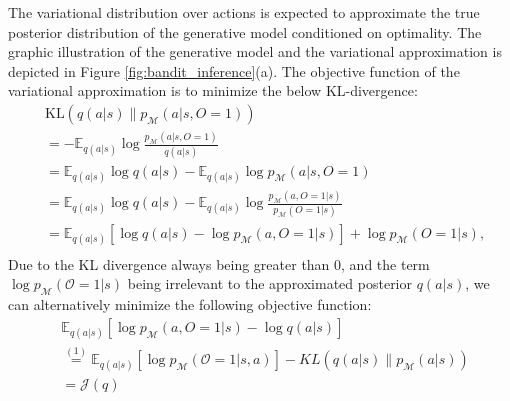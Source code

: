 \documentclass{article} %
\theoremstyle{plain}
\theoremstyle{definition}
\theoremstyle{remark}
\newcommand{\fig}{{Figure }}
\begin{document}
{The variational distribution over actions is expected to approximate the true posterior distribution of the generative model conditioned on optimality. The graphic illustration of the generative model and the variational approximation is depicted in \fig \ref{fig:bandit_inference}(a). The objective function of the variational approximation is to minimize the below KL-divergence:
\begin{equation}
\begin{aligned}
    &\text{KL}(q(a|s)\|p_{\mathcal{M}}(a|s,O=1))\\
    &=-\mathbb{E}_{q(a|s)} \log \frac{p_{\mathcal{M}}(a|s,O=1)}{q(a|s)}\\
    &=\mathbb{E}_{q(a|s)} \log q(a|s)-\mathbb{E}_{q(a|s)}\log p_{\mathcal{M}}(a|s,O=1)\\
    &=\mathbb{E}_{q(a|s)} \log q(a|s)-\mathbb{E}_{q(a|s)}\log\frac{p_{\mathcal{M}}(a,O=1|s)}{p_{\mathcal{M}}(O=1|s)}\\
    &=\mathbb{E}_{q(a|s)}\left[\log q(a|s)-\log p_{\mathcal{M}}(a,O=1|s)\right]+\log{p_{\mathcal{M}}(O=1|s)},\\    
\end{aligned}
\end{equation}
Due to the KL divergence always being greater than $0$, and the term $\log{p_{\mathcal{M}}(\mathcal{O}=1|s)}$ being irrelevant to the approximated posterior $q(a|s)$, we can alternatively minimize the following objective function:
\begin{equation}
\label{"state_obj"}
\begin{aligned}
        & \mathbb{E}_{q(a|s)}\left[\log p_{\mathcal{M}}(a,O=1|s)-\log q(a|s)\right]\\
        &\stackrel{(1)}{=}\mathbb{E}_{q(a|s)}[\log p_{\mathcal{M}}(\mathcal{O}=1|s,a)]-KL(q(a|s)\|p_\mathcal{M}(a|s)) \\
        &=\mathcal{J}(q)

\end{aligned}
\end{equation}}
\end{document}
